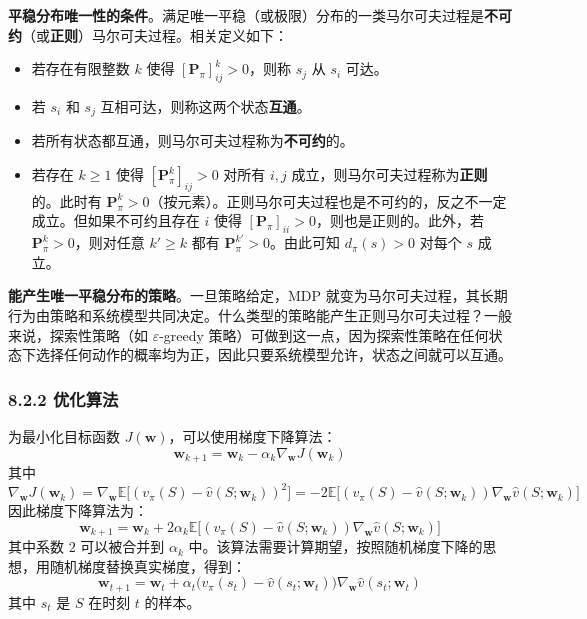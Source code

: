 \documentclass[UTF8]{article}
\begin{document}
\textbf{平稳分布唯一性的条件}。满足唯一平稳（或极限）分布的一类马尔可夫过程是\textbf{不可约}（或\textbf{正则}）马尔可夫过程。相关定义如下：
\begin{itemize}
    \item 若存在有限整数 $k$ 使得 $[\boldsymbol{P}_\pi]_{ij}^k > 0$，则称 $s_j$ 从 $s_i$ 可达。
    \item 若 $s_i$ 和 $s_j$ 互相可达，则称这两个状态\textbf{互通}。
    \item 若所有状态都互通，则马尔可夫过程称为\textbf{不可约}的。
    \item 若存在 $k \geq 1$ 使得 $[\boldsymbol{P}_\pi^k]_{ij} > 0$ 对所有 $i, j$ 成立，则马尔可夫过程称为\textbf{正则}的。此时有 $\boldsymbol{P}_\pi^k > 0$（按元素）。正则马尔可夫过程也是不可约的，反之不一定成立。但如果不可约且存在 $i$ 使得 $[\boldsymbol{P}_\pi]_{ii} > 0$，则也是正则的。此外，若 $\boldsymbol{P}_\pi^k > 0$，则对任意 $k' \geq k$ 都有 $\boldsymbol{P}_\pi^{k'} > 0$。由此可知 $d_\pi(s) > 0$ 对每个 $s$ 成立。
\end{itemize}

\textbf{能产生唯一平稳分布的策略}。一旦策略给定，MDP 就变为马尔可夫过程，其长期行为由策略和系统模型共同决定。什么类型的策略能产生正则马尔可夫过程？一般来说，探索性策略（如 $\varepsilon$-greedy 策略）可做到这一点，因为探索性策略在任何状态下选择任何动作的概率均为正，因此只要系统模型允许，状态之间就可以互通。

\subsubsection*{8.2.2 优化算法}

为最小化目标函数 $J(\boldsymbol{w})$，可以使用梯度下降算法：
\[
\boldsymbol{w}_{k+1} = \boldsymbol{w}_k - \alpha_k \nabla_{\boldsymbol{w}} J(\boldsymbol{w}_k)
\]
其中
\[
\nabla_{\boldsymbol{w}} J(\boldsymbol{w}_k) = \nabla_{\boldsymbol{w}} \mathbb{E}\big[(v_\pi(S) - \hat{v}(S; \boldsymbol{w}_k))^2\big]
    = -2\mathbb{E}\big[(v_\pi(S) - \hat{v}(S; \boldsymbol{w}_k)) \nabla_{\boldsymbol{w}} \hat{v}(S; \boldsymbol{w}_k)\big]
\]
因此梯度下降算法为：
\begin{equation}
\label{eq:gd}
\boldsymbol{w}_{k+1} = \boldsymbol{w}_k + 2\alpha_k \mathbb{E}\big[(v_\pi(S) - \hat{v}(S; \boldsymbol{w}_k)) \nabla_{\boldsymbol{w}} \hat{v}(S; \boldsymbol{w}_k)\big]
\end{equation}
其中系数 $2$ 可以被合并到 $\alpha_k$ 中。该算法需要计算期望，按照随机梯度下降的思想，用随机梯度替换真实梯度，得到：
\begin{equation}
\label{eq:sgd}
\boldsymbol{w}_{t+1} = \boldsymbol{w}_t + \alpha_t \big(v_\pi(s_t) - \hat{v}(s_t; \boldsymbol{w}_t)\big) \nabla_{\boldsymbol{w}} \hat{v}(s_t; \boldsymbol{w}_t)
\end{equation}
其中 $s_t$ 是 $S$ 在时刻 $t$ 的样本。
\end{document}
